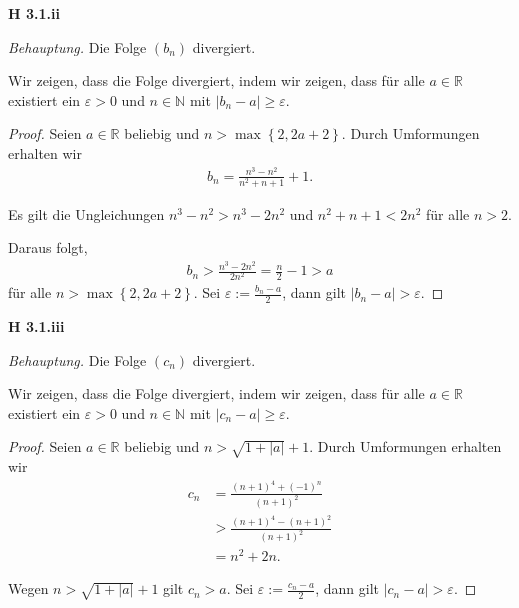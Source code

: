 \documentclass[12pt]{extarticle}
\begin{document}
\textbf{H 3.1.ii}

\textit{Behauptung.} Die Folge \((b_n)\) divergiert.

\vspace{4mm}
  Wir zeigen, dass die Folge divergiert, indem wir zeigen, dass für
  alle \(a \in \mathbb{R}\) existiert ein \(\varepsilon > 0\) und $n \in
  \mathbb{N}$ mit \(\left| b_n - a \right| \geq \varepsilon\).
\begin{proof}

  Seien \(a \in \mathbb{R}\) beliebig und $n > \max \left\{ 2,2a+2
  \right\}$.  Durch Umformungen erhalten wir
\begin{align*}
b_n=\frac{n^3-n^2}{n^2+n+1}+1.
\end{align*}

Es gilt die Ungleichungen
\(n^3-n^2 > n^3-2n^2\) und
\(n^2+n+1 < 2n^2\) für alle \(n > 2\).

Daraus folgt,
\begin{align*}
b_n > \frac{n^3-2n^2}{2n^2}=\frac{n}{2}-1 > a
\end{align*}
für alle \(n>\max \left\{ 2,2a+2 \right\}\).  Sei $\varepsilon :=
\frac{b_n-a}{2}$, dann gilt \(\left| b_n-a \right| > \varepsilon\).
\end{proof}

\textbf{H 3.1.iii}

\textit{Behauptung.} Die Folge \((c_n)\) divergiert.

\vspace{4mm}
  Wir zeigen, dass die Folge divergiert, indem wir zeigen, dass für
  alle \(a \in \mathbb{R}\) existiert ein \(\varepsilon > 0\) und $n \in
  \mathbb{N}$ mit \(\left| c_n - a \right| \geq \varepsilon\).

  \begin{proof}

    Seien \(a \in \mathbb{R}\) beliebig und
    \(n > \sqrt{1+ \left| a \right|} +1\).  Durch Umformungen erhalten
    wir
\begin{align*}
  c_n&=\frac{(n+1)^4+(-1)^n}{(n+1)^2}\\
     &>\frac{(n+1)^4-(n+1)^2}{(n+1)^2}\\
  &=n^2+2n.
\end{align*}

Wegen \(n > \sqrt{1+ \left| a \right|} +1\) gilt \(c_n > a\).
Sei $\varepsilon :=
\frac{c_n-a}{2}$, dann gilt \(\left| c_n-a \right| > \varepsilon\).

  \end{proof}
\end{document}
